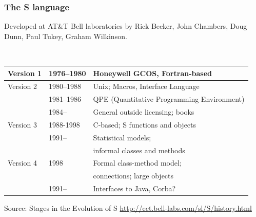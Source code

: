 \documentclass[svgnames]{beamer}
\begin{document}
\begin{frame}
  \frametitle{The S language}

  Developed at AT\&T Bell laboratories by Rick Becker, John Chambers,
  Doug Dunn, Paul Tukey, Graham Wilkinson.

  ~\\
  
  {\small
    \begin{tabular}{|lll|}
      \hline
      Version 1 & 1976--1980 & Honeywell GCOS, Fortran-based \\
      \hline
      Version 2 & 1980--1988 & Unix; Macros, Interface Language \\
      & 1981--1986 & QPE {\tiny (Quantitative  Programming Environment)} \\
      & 1984--     & General outside licensing; books \\
      \hline
      Version 3 & 1988-1998 & C-based; S functions and objects \\
      & 1991-- & Statistical models; \\
      &        & informal classes and methods \\
      \hline
      Version 4 & 1998 & Formal class-method model; \\
      & & connections; large objects\\
      & 1991-- & Interfaces to Java, Corba?\\
      \hline
    \end{tabular}
  }
  
  {\tiny Source: Stages in the Evolution of S
    \url{http://ect.bell-labs.com/sl/S/history.html}}

\end{frame}
\end{document}
